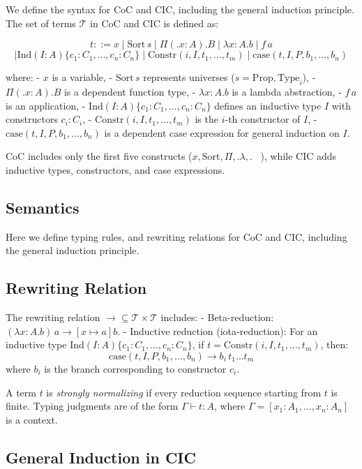 \documentclass{article}
\theoremstyle{plain}
\theoremstyle{definition}
\newcommand{\term}{\mathcal{T}}
\newcommand{\ctx}{\Gamma}
\newcommand{\lam}[2]{\lambda #1 . #2}
\newcommand{\fib}[2]{\Pi #1 . #2}
\newcommand{\app}[2]{#1 \, #2}
\newcommand{\subst}[3]{[#1 \mapsto #2] #3}
\newcommand{\rewrite}{\to}
\newcommand{\ind}{\text{Ind}}
\newcommand{\constr}{\text{Constr}}
\newcommand{\case}{\text{case}}
\begin{document}
We define the syntax for CoC and CIC, including the general induction principle.
The set of terms \(\term\) in CoC and CIC is defined as:

\[
t ::= x \mid \text{Sort} \, s \mid \fib (x : A). B \mid \lam{x : A}{b} \mid \app{f}{a}
\]
\[
\mid \ind(I : A)\{c_1 : C_1, \dots, c_n : C_n\} \mid \constr(i, I, t_1, \dots, t_m) \mid \case(t, I, P, b_1, \dots, b_n)
\]

where:
- \(x\) is a variable,
- \(\text{Sort} \, s\) represents universes (\(s = \text{Prop}, \text{Type}_i\)),
- \(\fib (x : A). B\) is a dependent function type,
- \(\lam{x : A}{b}\) is a lambda abstraction,
- \(\app{f}{a}\) is an application,
- \(\ind(I : A)\{c_1 : C_1, \dots, c_n : C_n\}\) defines an inductive type \(I\) with constructors \(c_i : C_i\),
- \(\constr(i, I, t_1, \dots, t_m)\) is the \(i\)-th constructor of \(I\),
- \(\case(t, I, P, b_1, \dots, b_n)\) is a dependent case expression for general induction on \(I\).

CoC includes only the first five constructs (\(x, \text{Sort}, \fib, \lam, \app\)),
while CIC adds inductive types, constructors, and case expressions.

\subsection*{Semantics}
Here we define typing rules, and rewriting relations for CoC and CIC,
including the general induction principle.

\subsection{Rewriting Relation}
The rewriting relation \(\rewrite \subseteq \term \times \term\) includes:
- Beta-reduction: \(\app{(\lam{x : A}{b})}{a} \rewrite \subst{x}{a}{b}\).
- Inductive reduction (iota-reduction): For an inductive type
  \(\ind(I : A)\{c_1 : C_1, \dots, c_n : C_n\}\), if \(t = \constr(i, I, t_1, \dots, t_m)\), then:
  \[
  \case(t, I, P, b_1, \dots, b_n) \rewrite \app{b_i}{t_1} \dots t_m
  \]
  where \(b_i\) is the branch corresponding to constructor \(c_i\).

A term \(t\) is \emph{strongly normalizing} if every reduction sequence
starting from \(t\) is finite. Typing judgments are of the
form \(\ctx \vdash t : A\), where \(\ctx = [x_1 : A_1, \dots, x_n : A_n]\) is a context.

\subsection{General Induction in CIC}
\end{document}
